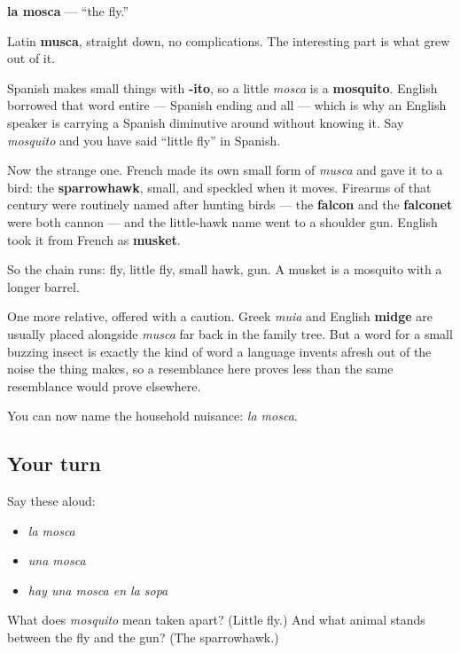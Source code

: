 \begin{cousinweb}
\textbf{la mosca} — \textquotedblleft{}the fly.\textquotedblright{}

Latin \textbf{musca}, straight down, no complications. The interesting part is what grew out of it.

Spanish makes small things with \textbf{-ito}, so a little \emph{mosca} is a \textbf{mosquito}. English borrowed that word entire — Spanish ending and all — which is why an English speaker is carrying a Spanish diminutive around without knowing it. Say \emph{mosquito} and you have said \textquotedblleft{}little fly\textquotedblright{} in Spanish.

Now the strange one. French made its own small form of \emph{musca} and gave it to a bird: the \textbf{sparrowhawk}, small, and speckled when it moves. Firearms of that century were routinely named after hunting birds — the \textbf{falcon} and the \textbf{falconet} were both cannon — and the little-hawk name went to a shoulder gun. English took it from French as \textbf{musket}.

So the chain runs: fly, little fly, small hawk, gun. A musket is a mosquito with a longer barrel.

One more relative, offered with a caution. Greek \emph{muia} and English \textbf{midge} are usually placed alongside \emph{musca} far back in the family tree. But a word for a small buzzing insect is exactly the kind of word a language invents afresh out of the noise the thing makes, so a resemblance here proves less than the same resemblance would prove elsewhere.
\end{cousinweb}

\begin{grammarlens}[title={What you've built}]
You can now name the household nuisance: \emph{la mosca}.
\end{grammarlens}

\subsection*{Your turn}
Say these aloud:

\begin{itemize}
\raggedright
  \item \emph{la mosca}
  \item \emph{una mosca}
  \item \emph{hay una mosca en la sopa}
\end{itemize}

\begin{tcolorbox}[breakable,colback=teal!4,colframe=teal!35!black,title={Before you move on}]
What does \emph{mosquito} mean taken apart? (Little fly.) And what animal stands between the fly and the gun? (The sparrowhawk.)
\end{tcolorbox}
